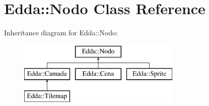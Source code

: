 \hypertarget{class_edda_1_1_nodo}{
\section{Edda::Nodo Class Reference}
\label{class_edda_1_1_nodo}
}
Inheritance diagram for Edda::Nodo:\begin{figure}[H]
\begin{center}
\leavevmode
\includegraphics[height=3.000000cm]{class_edda_1_1_nodo}
\end{center}
\end{figure}
